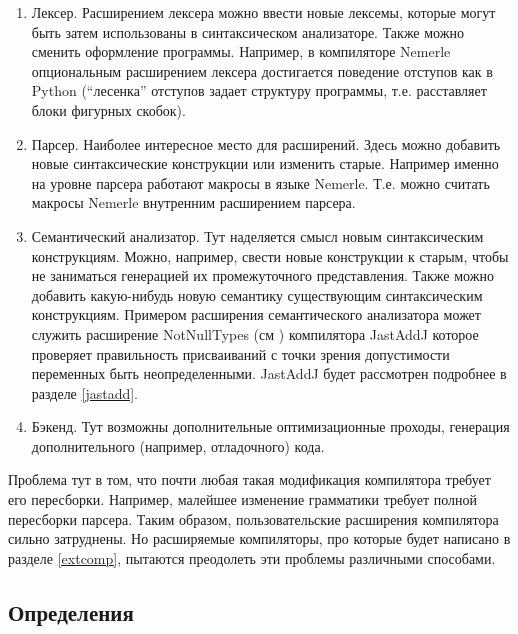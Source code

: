 \documentclass[a4paper,12pt,titlepage]{extarticle}
\begin{document}
\begin{enumerate}
  \item Лексер. Расширением лексера можно ввести новые лексемы, которые могут
  быть затем использованы в синтаксическом анализаторе. Также можно сменить
  оформление программы. Например, в компиляторе Nemerle опциональным расширением
  лексера достигается поведение отступов как в Python (``лесенка'' отступов
  задает структуру программы, т.е. расставляет блоки фигурных скобок).
  \item Парсер. Наиболее интересное место для расширений. Здесь можно добавить
  новые синтаксические конструкции или изменить старые. Например именно на
  уровне парсера работают макросы в языке Nemerle. Т.е. можно считать макросы Nemerle
  внутренним расширением парсера.
  \item Семантический анализатор. Тут наделяется смысл новым
  синтаксическим конструкциям. Можно, например, свести новые конструкции к
  старым, чтобы не заниматься генерацией их промежуточного представления.
  Также можно добавить какую-нибудь новую семантику существующим
  синтаксическим конструкциям. Примером расширения семантического анализатора
  может служить расширение NotNullTypes (см \cite{janotnull}) компилятора
  JastAddJ которое проверяет правильность присваиваний с точки зрения
  допустимости переменных быть неопределенными. JastAddJ будет
  рассмотрен подробнее в разделе \ref{jastadd}.
  \item Бэкенд. Тут возможны дополнительные оптимизационные проходы, генерация
  дополнительного (например, отладочного) кода.
\end{enumerate}
Проблема тут в том, что почти любая такая модификация компилятора требует его
пересборки. Например, малейшее изменение грамматики требует полной пересборки
парсера. Таким образом, пользовательские расширения компилятора сильно
затруднены. Но расширяемые компиляторы, про которые будет написано в разделе
\ref{extcomp}, пытаются преодолеть эти проблемы различными способами.

\pagebreak[4]
\subsection{Определения}
\end{document}

